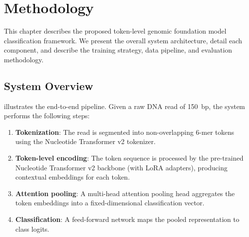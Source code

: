 
\chapter{Methodology}
\label{ch:methodology}

This chapter describes the proposed token-level genomic foundation model classification framework. We present the overall system architecture, detail each component, and describe the training strategy, data pipeline, and evaluation methodology.

\section{System Overview}
\label{sec:method-overview}

 illustrates the end-to-end pipeline. Given a raw DNA read of 150~bp, the system performs the following steps:
\begin{enumerate}
    \item \textbf{Tokenization}: The read is segmented into non-overlapping 6-mer tokens using the Nucleotide Transformer v2 tokenizer.
    \item \textbf{Token-level encoding}: The token sequence is processed by the pre-trained Nucleotide Transformer v2 backbone (with LoRA adapters), producing contextual embeddings for each token.
    \item \textbf{Attention pooling}: A multi-head attention pooling head aggregates the token embeddings into a fixed-dimensional classification vector.
    \item \textbf{Classification}: A feed-forward network maps the pooled representation to class logits.
\end{enumerate}

